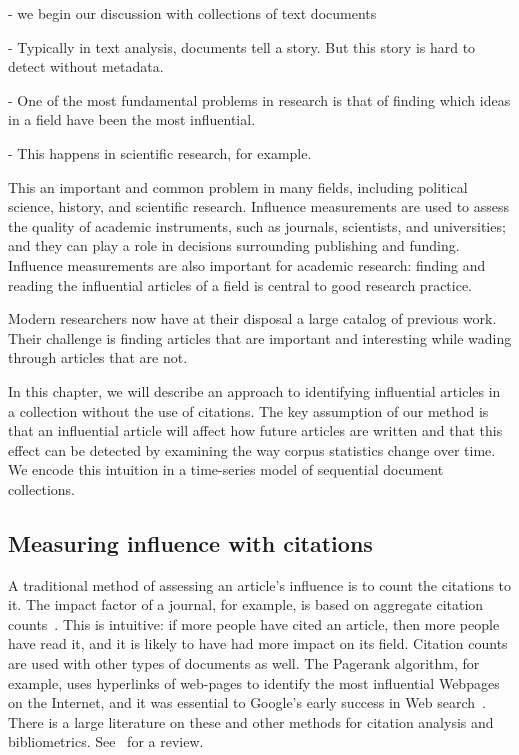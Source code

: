 
- we begin our discussion with collections of text documents

- Typically in text analysis, documents tell a story.  But this story
is hard to detect without metadata.

- One of the most fundamental problems in research is that of finding
which ideas in a field have been the most influential.

- This happens in scientific research, for example.

This an important and common problem in many fields, including
political science, history, and scientific research.
Influence measurements are used to assess the quality of academic
instruments, such as journals, scientists, and universities; and they
can play a role in decisions surrounding publishing and funding.
Influence measurements are also important for academic research:
finding and reading the influential articles of a field is central to
good research practice.

Modern researchers now have at their disposal a large catalog of
previous work.  Their challenge is finding articles that are important
and interesting while wading through articles that are not.

In this chapter, we will describe an approach to identifying
influential articles in a collection without the use of citations.
The key assumption of our method is that an influential article will
affect how future articles are written and that this effect can be
detected by examining the way corpus statistics change over time.  We
encode this intuition in a time-series model of sequential document
collections.

\subsection*{Measuring influence with citations}

A traditional method of assessing an article's influence is to count
the citations to it. The impact factor of a journal, for example, is
based on aggregate citation counts~\cite{garfield:2002}.  This is
intuitive: if more people have cited an article, then more people have
read it, and it is likely to have had more impact on its field.
Citation counts are used with other types of documents as well.  The
Pagerank algorithm, for example, uses hyperlinks of web-pages to
identify the most influential Webpages on the Internet, and it was
essential to Google's early success in Web search~\cite{brin:1998}.
There is a large literature on these and other methods for citation
analysis and bibliometrics.  See~\cite{osareh:1996} for a review.

